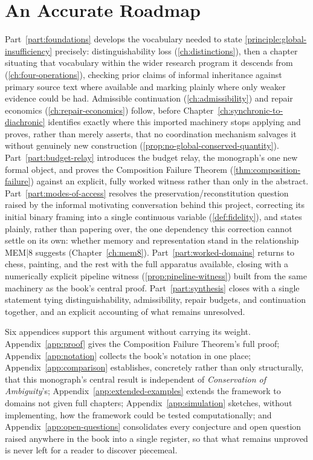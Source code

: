 \section{An Accurate Roadmap}

Part~\ref{part:foundations} develops the vocabulary needed to state
\cref{principle:global-insufficiency} precisely: distinguishability loss
(\cref{ch:distinctions}), then a chapter situating that vocabulary within
the wider research program it descends from
(\cref{ch:four-operations}), checking prior claims of informal
inheritance against primary source text where available and marking
plainly where only weaker evidence could be had. Admissible continuation
(\cref{ch:admissibility}) and repair economics
(\cref{ch:repair-economics}) follow, before Chapter~\ref{ch:synchronic-to-diachronic}
identifies exactly where this imported machinery stops applying and
proves, rather than merely asserts, that no coordination mechanism
salvages it without genuinely new construction
(\cref{prop:no-global-conserved-quantity}). Part~\ref{part:budget-relay}
introduces the budget relay, the monograph's one new formal object, and
proves the Composition Failure Theorem
(\cref{thm:composition-failure}) against an explicit, fully worked
witness rather than only in the abstract. Part~\ref{part:modes-of-access}
resolves the preservation/reconstitution question raised by the informal
motivating conversation behind this project, correcting its initial
binary framing into a single continuous variable
(\cref{def:fidelity}), and states plainly, rather than papering over,
the one dependency this correction cannot settle on its own: whether
memory and representation stand in the relationship MEM|8 suggests
(Chapter~\ref{ch:mem8}). Part~\ref{part:worked-domains} returns to
chess, painting, and the rest with the full apparatus available, closing
with a numerically explicit pipeline witness
(\cref{prop:pipeline-witness}) built from the same machinery as the
book's central proof. Part~\ref{part:synthesis} closes with a single
statement tying distinguishability, admissibility, repair budgets, and
continuation together, and an explicit accounting of what remains
unresolved.

Six appendices support this argument without carrying its weight.
Appendix~\ref{app:proof} gives the Composition Failure Theorem's full
proof; Appendix~\ref{app:notation} collects the book's notation in one
place; Appendix~\ref{app:comparison} establishes, concretely rather than
only structurally, that this monograph's central result is independent
of \emph{Conservation of Ambiguity}'s; Appendix~\ref{app:extended-examples}
extends the framework to domains not given full chapters;
Appendix~\ref{app:simulation} sketches, without implementing, how the
framework could be tested computationally; and
Appendix~\ref{app:open-questions} consolidates every conjecture and open
question raised anywhere in the book into a single register, so that
what remains unproved is never left for a reader to discover piecemeal.


